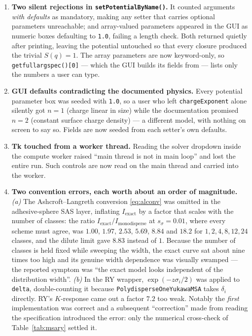 \documentclass[11pt,a4paper]{article}
\newcommand{\code}[1]{\texttt{#1}}
\begin{document}
\begin{enumerate}
\item \textbf{Two silent rejections in \code{setPotentialByName()}.} It
counted arguments \emph{with defaults} as mandatory, making any setter that
carries optional parameters unreachable; and array-valued parameters appeared
in the GUI as numeric boxes defaulting to \code{1.0}, failing a length check.
Both returned quietly after printing, leaving the potential untouched so that
every closure produced the trivial $S(q)=1$. The array parameters are now
keyword-only, so \code{getfullargspec()[0]} --- which the GUI builds its
fields from --- lists only the numbers a user can type.

\item \textbf{GUI defaults contradicting the documented physics.} Every
potential parameter box was seeded with \code{1.0}, so a user who left
\code{chargeExponent} alone silently got $n=1$ (charge linear in size) while
the documentation promised $n=2$ (constant surface charge density) --- a
different model, with nothing on screen to say so. Fields are now seeded from
each setter's own defaults.

\item \textbf{Tk touched from a worker thread.} Reading the solver dropdown
inside the compute worker raised ``main thread is not in main loop'' and lost
the entire run. Such controls are now read on the main thread and carried into
the worker.

\item \textbf{Two convention errors, each worth about an order of
magnitude.}
\emph{(a)} The Ashcroft--Langreth conversion \eqref{eq:alconv} was omitted in
the adhesive-sphere SAS layer, inflating $I_{\text{exact}}$ by a factor that
scales with the number of classes: the ratio
$I_{\text{exact}}/I_{\text{monodisperse}}$ at $s_\sigma=0.01$, where every
scheme must agree, was $1.00$, $1.97$, $2.53$, $5.69$, $8.84$ and $18.2$ for
$1,2,4,8,12,24$ classes, and the dilute limit gave $8.83$ instead of $1$.
Because the number of classes is held fixed while sweeping the width, the
exact curve sat about nine times too high and its genuine width dependence was
visually swamped --- the reported symptom was ``the exact model looks
independent of the distribution width''.
\emph{(b)} In the RY wrapper, $\exp(-z\sigma_i/2)$ was applied to
\code{delta}, double-counting it because
\code{PolydisperseOneYukawaMSA} takes $\delta_i$ directly. RY's $K$-response
came out a factor $7.2$ too weak. Notably the \emph{first} implementation was
correct and a subsequent ``correction'' made from reading the specification
introduced the error: only the numerical cross-check of
Table~\ref{tab:msary} settled it.
\end{enumerate}
\end{document}
